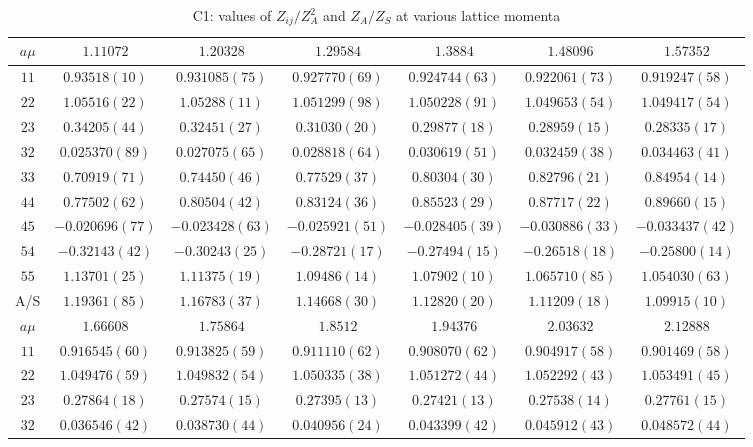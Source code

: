 \begin{table}
\begin{center}
\caption{C1: values of $Z_{ij}/Z_A^2$ and $Z_A/Z_S$ at various lattice momenta}
\begin{tabular}{c|c c c c c c}
\hline
\hline
$a\mu$ & $1.11072$ & $1.20328$ & $1.29584$ & $1.3884$ & $1.48096$ & $1.57352$ \\
\hline
$11$ & $0.93518(10)$ & $0.931085(75)$ & $0.927770(69)$ & $0.924744(63)$ & $0.922061(73)$ & $0.919247(58)$ \\
$22$ & $1.05516(22)$ & $1.05288(11)$ & $1.051299(98)$ & $1.050228(91)$ & $1.049653(54)$ & $1.049417(54)$ \\
$23$ & $0.34205(44)$ & $0.32451(27)$ & $0.31030(20)$ & $0.29877(18)$ & $0.28959(15)$ & $0.28335(17)$ \\
$32$ & $0.025370(89)$ & $0.027075(65)$ & $0.028818(64)$ & $0.030619(51)$ & $0.032459(38)$ & $0.034463(41)$ \\
$33$ & $0.70919(71)$ & $0.74450(46)$ & $0.77529(37)$ & $0.80304(30)$ & $0.82796(21)$ & $0.84954(14)$ \\
$44$ & $0.77502(62)$ & $0.80504(42)$ & $0.83124(36)$ & $0.85523(29)$ & $0.87717(22)$ & $0.89660(15)$ \\
$45$ & $-0.020696(77)$ & $-0.023428(63)$ & $-0.025921(51)$ & $-0.028405(39)$ & $-0.030886(33)$ & $-0.033437(42)$ \\
$54$ & $-0.32143(42)$ & $-0.30243(25)$ & $-0.28721(17)$ & $-0.27494(15)$ & $-0.26518(18)$ & $-0.25800(14)$ \\
$55$ & $1.13701(25)$ & $1.11375(19)$ & $1.09486(14)$ & $1.07902(10)$ & $1.065710(85)$ & $1.054030(63)$ \\
\hline
A/S & $1.19361(85)$ & $1.16783(37)$ & $1.14668(30)$ & $1.12820(20)$ & $1.11209(18)$ & $1.09915(10)$ \\
\hline
$a\mu$ & $1.66608$ & $1.75864$ & $1.8512$ & $1.94376$ & $2.03632$ & $2.12888$ \\
\hline
$11$ & $0.916545(60)$ & $0.913825(59)$ & $0.911110(62)$ & $0.908070(62)$ & $0.904917(58)$ & $0.901469(58)$ \\
$22$ & $1.049476(59)$ & $1.049832(54)$ & $1.050335(38)$ & $1.051272(44)$ & $1.052292(43)$ & $1.053491(45)$ \\
$23$ & $0.27864(18)$ & $0.27574(15)$ & $0.27395(13)$ & $0.27421(13)$ & $0.27538(14)$ & $0.27761(15)$ \\
$32$ & $0.036546(42)$ & $0.038730(44)$ & $0.040956(24)$ & $0.043399(42)$ & $0.045912(43)$ & $0.048572(44)$ \\

\end{tabular}
\end{center}
\end{table}
